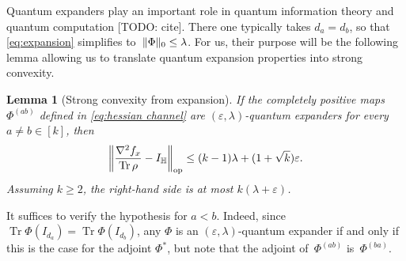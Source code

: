 \documentclass[aos]{imsart}
\newtheorem{lemma}[theorem]{Lemma}
\theoremstyle{definition}
\numberwithin{equation}{section}
\DeclareMathOperator{\op}{op}
\DeclareMathOperator{\tr}{Tr}
\DeclarePairedDelimiter{\norm}{\lVert}{\rVert}
\renewcommand{\H}{{\mathbb{H}}}
\newcommand{\eps}{\varepsilon}
\newcommand{\TODO}[1]{{\color{blue}[TODO: #1]}}
\begin{document}
Quantum expanders play an important role in quantum information theory and quantum computation \TODO{cite}.
There one typically takes $d_a=d_b$, so that \cref{eq:expansion} simplifies to~$\norm{\Phi}_0 \leq \lambda$.
For us, their purpose will be the following lemma allowing us to translate quantum expansion properties into strong convexity.

\begin{lemma}[Strong convexity from expansion]\label{lem:expansion-convexity}
If the completely positive maps $\Phi^{(ab)}$ defined in \cref{eq:hessian channel} are $(\eps,\lambda)$-quantum expanders for every $a\neq b\in[k]$, then
\begin{align*}
  \norm*{\frac{\nabla^2 f_x}{\tr \rho} - I_\H}_{\op}
\leq (k-1)\lambda + (1 + \sqrt k) \eps.
\end{align*}
Assuming $k\geq2$, the right-hand side is at most $k (\lambda + \eps)$.
\end{lemma}
\noindent
It suffices to verify the hypothesis for $a<b$.
Indeed, since $\tr \Phi(I_{d_a}) = \tr \Phi(I_{d_b})$, any $\Phi$ is an $(\eps,\lambda)$-quantum expander if and only if this is the case for the adjoint $\Phi^*$, but note that the adjoint of~$\Phi^{(ab)}$ is~$\Phi^{(ba)}$.
\end{document}
